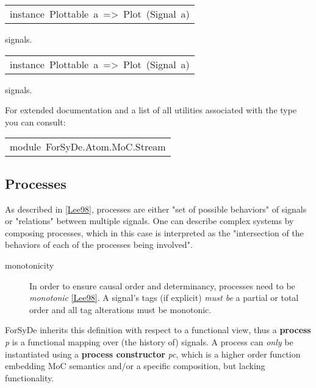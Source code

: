 \begin{haddockdesc}
\item[\begin{tabular}{@{}l}
instance\ Plottable\ a\ =>\ Plot\ (Signal\ a)
\end{tabular}]\haddockbegindoc
{} signals.\par

\end{haddockdesc}
\begin{haddockdesc}
\item[\begin{tabular}{@{}l}
instance\ Plottable\ a\ =>\ Plot\ (Signal\ a)
\end{tabular}]\haddockbegindoc
{} signals.\par

\end{haddockdesc}
For extended documentation and a list of all utilities associated
 with the  type you can consult:\par

\begin{haddockdesc}
\item[\begin{tabular}{@{}l}
module\ ForSyDe.Atom.MoC.Stream
\end{tabular}]
\end{haddockdesc}
\subsection{Processes}
As described in \href{#lee98}{[Lee98]}, processes are either "set of
 possible behaviors" of signals or "relations" between multiple
 signals. One can describe complex systems by composing processes,
 which in this case is interpreted as the "intersection of the
 behaviors of each of the processes being involved".\par
\begin{description}
\item[monotonicity] In order to ensure causal order and determinancy,
 processes need to be \emph{monotonic} \href{#lee98}{[Lee98]}. A signal's
 tags (if explicit) \emph{must be} a partial or total order and all tag
 alterations must be monotonic.
\end{description}ForSyDe inherits this definition with respect to a functional
 view, thus a \textbf{process} \emph{p} is a functional mapping over (the
 history of) signals. A process can \emph{only} be instantiated using a
 \textbf{process constructor} \emph{pc}, which is a higher order function
 embedding MoC semantics and/or a specific composition, but
 lacking functionality.\par
                 
